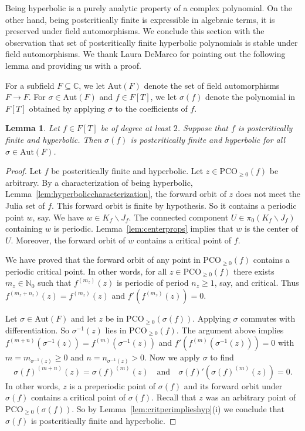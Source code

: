 \documentclass[12pt,oneside,a4]{amsart}
\newcommand{\IC}{\mathbb{C}}
\newcommand{\IN}{\mathbb{N}}
\newcounter{maincounter}
\numberwithin{maincounter}{section}
\numberwithin{equation}{section}
\newtheorem{lemma}[maincounter]{Lemma}
\renewcommand{\subset}{\subseteq}
\newcommand{\ssm}{\smallsetminus}
\newcommand{\pco}{\mathrm{PCO}}
\begin{document}
Being hyperbolic is a purely analytic property of a complex
polynomial.
On the other hand, being postcritically finite is expressible in
algebraic terms, it is preserved under field automorphisms. 
We conclude this section with the observation that set of
postcritically finite hyperbolic polynomials is stable under
field automorphisms.
We thank Laura DeMarco for pointing out the following lemma and
providing us with a proof.

For a subfield $F\subset\IC$, we let $\mathrm{Aut}(F)$ denote the set
of field automorphisms $F\rightarrow F$. 
For $\sigma\in \mathrm{Aut}(F)$ and
 $f\in F[T]$, we let $\sigma(f)$ denote the polynomial in $F[T]$
obtained by applying $\sigma$ to the coefficients of $f$.


\begin{lemma}
  \label{lem:pcfhyperbolicgalois}
  Let $f\in F[T]$ be of degree at least $2$. Suppose that $f$ is
  postcritically finite and hyperbolic.
  Then $\sigma(f)$ is postcritically finite and hyperbolic for all
  $\sigma\in \mathrm{Aut}(F)$. 
\end{lemma}
\begin{proof}
  Let $f$ be postcritically finite and hyperbolic. Let $z\in \pco_{\ge
    0}(f)$ be arbitrary. By a characterization of being hyperbolic,
  Lemma~\ref{lem:hyperboliccharacterization}, the forward orbit of $z$
  does not meet the Julia set of $f$. This forward orbit is finite by
  hypothesis. So it contains a periodic point $w$, say. We have $w\in
  K_f\ssm J_f$. The connected component $U\in \pi_0(K_f\ssm J_f)$
  containing $w$ is periodic. Lemma~\ref{lem:centerprops} implies that
  $w$ is the center of $U$. Moreover, the forward orbit of $w$ contains
  a critical point of $f$.
  
  We have proved that the forward orbit of any point in $\pco_{\ge
    0}(f)$ contains a periodic critical point.
  In other words,  for all $z\in \pco_{\ge 0}(f)$ there exists $m_z\in \IN_0$ such that
  $f^{(m_z)}(z)$ is periodic of period $n_z\ge 1$, say, and critical.
  Thus $f^{(m_z+n_z)}(z)=f^{(m_z)}(z)$ and $f'(f^{(m_z)}(z))=0$. 

  Let $\sigma\in \mathrm{Aut}(F)$ and let $z$ be in $\pco_{\ge
    0}(\sigma(f))$.  Applying $\sigma$ commutes with differentiation.
  So $\sigma^{-1}(z)$ lies in $\mathrm{PCO}_{\ge 0}(f)$.  The
  argument above implies
  $f^{(m+n)}(\sigma^{-1}(z)) =
  f^{(m)}(\sigma^{-1}(z))$ and
  $f'(f^{(m)}(\sigma^{-1}(z)))=0$
  with $m=m_{\sigma^{-1}(z)}\ge 0$ and $n=n_{\sigma^{-1}(z)}>0$.
  Now we apply $\sigma$ to find
  $$
  \sigma(f)^{(m+n)}(z)= \sigma(f)^{(m)}(z) \quad\text{and}\quad
  \sigma(f)'(\sigma(f)^{(m)}(z))=0.
  $$
  In other words,  $z$ is a preperiodic point of $\sigma(f)$ and its forward orbit
  under $\sigma(f)$ contains a critical point of $\sigma(f)$.
  Recall that  $z$ was an arbitrary  point of $\pco_{\ge
    0}(\sigma(f))$.
  So by Lemma~\ref{lem:critperimplieshyp}(i) we
  conclude that $\sigma(f)$ is postcritically finite and hyperbolic. 
\end{proof}
\end{document}
